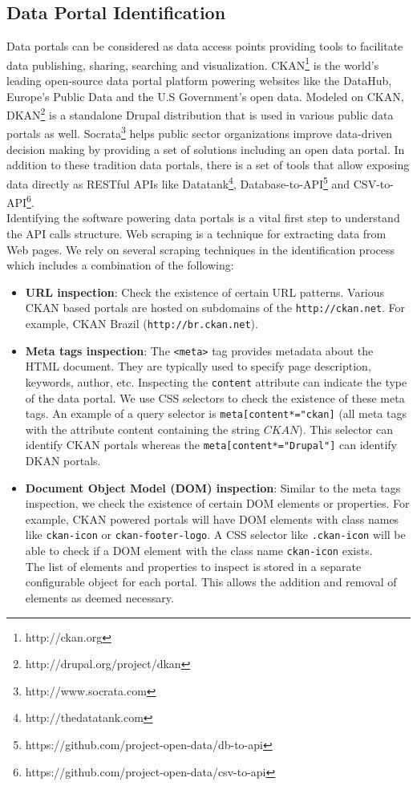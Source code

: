 \documentclass[runningheads,a4paper]{llncs}
\begin{document}
\subsection{Data Portal Identification}

Data portals can be considered as data access points providing tools to facilitate data publishing, sharing, searching and visualization. CKAN\footnote{http://ckan.org} is the world's leading open-source data portal platform powering websites like the DataHub, Europe's Public Data and the U.S Government's open data. Modeled on CKAN, DKAN\footnote{http://drupal.org/project/dkan} is a standalone Drupal distribution that is used in various public data portals as well. Socrata\footnote{http://www.socrata.com} helps public sector organizations improve data-driven decision making by providing a set of solutions including an open data portal. In addition to these tradition data portals, there is a set of tools that allow exposing data directly as RESTful APIs like Datatank\footnote{http://thedatatank.com}, Database-to-API\footnote{https://github.com/project-open-data/db-to-api} and CSV-to-API\footnote{https://github.com/project-open-data/csv-to-api}.\\

Identifying the software powering data portals is a vital first step to understand the API calls structure. Web scraping is a technique for extracting data from Web pages. We rely on several scraping techniques in the identification process which includes a combination of the following:

\begin{itemize}
  \item \textbf{URL inspection}: Check the existence of certain URL patterns. Various CKAN based portals are hosted on subdomains of the \texttt{http://ckan.net}. For example, CKAN Brazil (\texttt{http://br.ckan.net}).
  \item \textbf{Meta tags inspection}: The \texttt{<meta>} tag provides metadata about the HTML document. They are typically used to specify page description, keywords, author, etc. Inspecting the \texttt{content} attribute can indicate the type of the data portal. We use CSS selectors to check the existence of these meta tags. An example of a query selector is \texttt{meta[content*="ckan]} (all meta tags with the attribute content containing the string $CKAN$). This selector can identify CKAN portals whereas the \texttt{meta[content*="Drupal"]} can identify DKAN portals.
  \item \textbf{Document Object Model (DOM) inspection}: Similar to the meta tags inspection, we check the existence of certain DOM elements or properties. For example, CKAN powered portals will have DOM elements with class names like \texttt{ckan-icon} or \texttt{ckan-footer-logo}. A CSS selector like \texttt{.ckan-icon} will be able to check if a DOM element with the class name \texttt{ckan-icon} exists.\\
  The list of elements and properties to inspect is stored in a separate configurable object for each portal. This allows the addition and removal of elements as deemed necessary.
\end{itemize}
\end{document}
